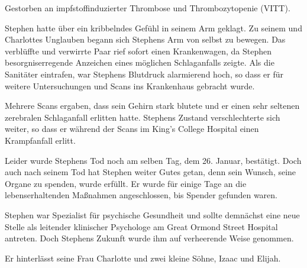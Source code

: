 Gestorben an impfstoffinduzierter Thrombose und Thrombozytopenie (VITT).

Stephen hatte über ein kribbelndes Gefühl in seinem Arm geklagt. Zu seinem und
Charlottes Unglauben begann sich Stephens Arm von selbst zu bewegen. Das
verblüffte und verwirrte Paar rief sofort einen Krankenwagen, da Stephen
besorgniserregende Anzeichen eines möglichen Schlaganfalls zeigte. Als die
Sanitäter eintrafen, war Stephens Blutdruck alarmierend hoch, so dass er für
weitere Untersuchungen und Scans ins Krankenhaus gebracht wurde.

Mehrere Scans ergaben, dass sein Gehirn stark blutete und er einen sehr seltenen
zerebralen Schlaganfall erlitten hatte. Stephens Zustand verschlechterte sich
weiter, so dass er während der Scans im King's College Hospital einen
Krampfanfall erlitt.

Leider wurde Stephens Tod noch am selben Tag, dem 26. Januar, bestätigt. Doch
auch nach seinem Tod hat Stephen weiter Gutes getan, denn sein Wunsch, seine
Organe zu spenden, wurde erfüllt. Er wurde für einige Tage an die
lebenserhaltenden Maßnahmen angeschlossen, bis Spender gefunden waren.

Stephen war Spezialist für psychische Gesundheit und sollte demnächst eine neue
Stelle als leitender klinischer Psychologe am Great Ormond Street Hospital
antreten. Doch Stephens Zukunft wurde ihm auf verheerende Weise genommen.

Er hinterlässt seine Frau Charlotte und zwei kleine Söhne, Izaac und Elijah.
